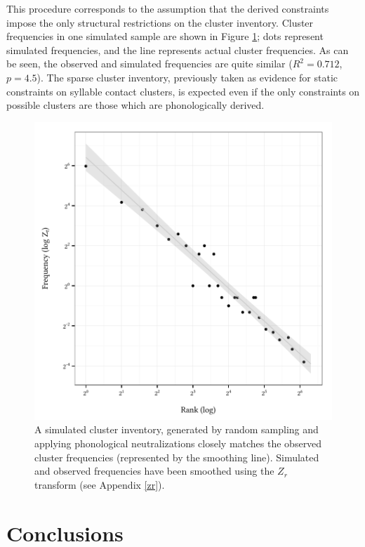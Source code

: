 This procedure corresponds to the assumption that the derived constraints impose the only structural restrictions on the cluster inventory.
Cluster frequencies in one simulated sample are shown in Figure \ref{sim}; dots represent simulated frequencies, and the line represents actual cluster frequencies.
As can be seen, the observed and simulated frequencies are quite similar 
($R^2 = 0.712$, $p = 4.5$).
The sparse cluster inventory, previously taken as evidence for static constraints on syllable contact clusters, is expected even if the only constraints on possible clusters are those which are phonologically derived.

\begin{figure}[ht]
\centering
\includegraphics{sim.pdf}
\caption{A simulated cluster inventory, generated by random sampling and applying phonological neutralizations closely matches the observed cluster frequencies (represented by the smoothing line). Simulated and observed frequencies have been smoothed using the $Z_r$ transform (see Appendix \ref{zr}).}
\label{sim}
\end{figure}

\section{Conclusions}

